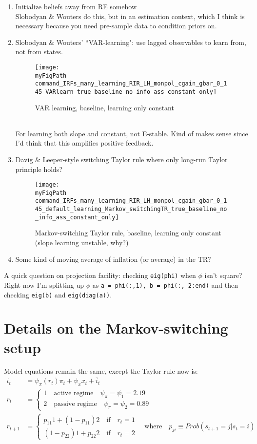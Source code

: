 \documentclass[11pt]{article}
\def \myFigPath {../figures/}
\renewcommand{\[}{\begin{equation}}
\renewcommand{\]}{\end{equation}}
\def\mySmallerFigScale{0.18}
\begin{document}
\begin{enumerate}
\item Initialize beliefs away from RE somehow\\
Slobodyan \& Wouters do this, but in an estimation context, which I think is necessary because you need pre-sample data to condition priors on.
\item Slobodyan \& Wouters' ``VAR-learning": use lagged observables to learn from, not from states.  \\
\begin{figure}[h!]
\texttt{[image: \\myFigPath command\_IRFs\_many\_learning\_RIR\_LH\_monpol\_cgain\_gbar\_0\_145\_VARlearn\_true\_baseline\_no\_info\_ass\_constant\_only]}
\caption{ VAR learning, baseline, learning only constant}
\end{figure} \\
For learning both slope and constant, not E-stable. Kind of makes sense since I'd think that this amplifies positive feedback.
\item Davig \& Leeper-style switching Taylor rule where only long-run Taylor principle holds?
\begin{figure}[h!]
\texttt{[image: \\myFigPath command\_IRFs\_many\_learning\_RIR\_LH\_monpol\_cgain\_gbar\_0\_145\_default\_learning\_Markov\_switchingTR\_true\_baseline\_no\_info\_ass\_constant\_only]}
\caption{ Markov-switching Taylor rule, baseline, learning only constant (slope learning unstable, why?)}
\end{figure}
\item Some kind of moving average of inflation (or average) in the TR?
\end{enumerate}

A quick question on projection facility: checking \texttt{eig(phi)} when $\phi$ isn't square? \\
Right now I'm splitting up $\phi$ as \texttt{a = phi(:,1), b = phi(:, 2:end)} and then checking \texttt{eig(b)} and \texttt{eig(diag(a))}.

\section{Details on the Markov-switching setup}
Model equations remain the same, except the Taylor rule now is:
\begin{align}
i_t & = \psi_{\pi}(r_t) \pi_t + \psi_x x_t + \bar{i}_t \\
r_t & = \begin{cases} 1 \quad \text{active regime} \quad  \psi_{\pi} = \psi_1 = 2.19  \\  2 \quad \text{passive regime} \quad  \psi_{\pi} = \psi_2= 0.89 \end{cases} \\
r_{t+1} &= \begin{cases} p_{11} 1 + (1-p_{11}) 2 \quad \text{if} \quad r_t = 1\\ (1-p_{22}) 1 + p_{22} 2 \quad \text{if} \quad r_t = 2\end{cases} \quad \text{where} \quad p_{ji}\equiv Prob(s_{t+1}=j | s_t = i)
\end{align}
\end{document}
